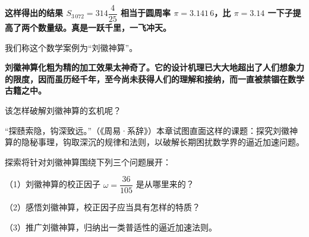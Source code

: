 \documentclass[
  10pt,
  fontset=fandol]{ctexart}
\begin{document}
\textbf{这样得出的结果 \(S_{3\,072}=314\dfrac{4}{25}\) 相当于圆周率 \(\pi=3.141\,6\)，比 \(\pi=3.14\) 一下子提高了两个数量级。真是一跃千里，一飞冲天。}

我们称这个数学案例为``刘徽神算''。

\textbf{刘徽神算化粗为精的加工效果太神奇了。它的设计机理已大大地超出了人们想象力的限度，因而虽历经千年，至今尚未获得人们的理解和接纳，而一直被禁锢在数学古籍之中。}

该怎样破解刘徽神算的玄机呢？

``探赜索隐，钩深致远。''（《周易·系辞》）本章试图直面这样的课题：探究刘徽神算的隐秘事理，钩取深沉的规律和法则，以破解长期困扰数学界的逼近加速问题。

探索将针对刘徽神算围绕下列三个问题展开：

（1）刘徽神算的校正因子 \(\omega=\dfrac{36}{105}\) 是从哪里来的？

（2）感悟刘徽神算，校正因子应当具有怎样的特质？

（3）推广刘徽神算，归纳出一类普适性的逼近加速法则。
\end{document}
